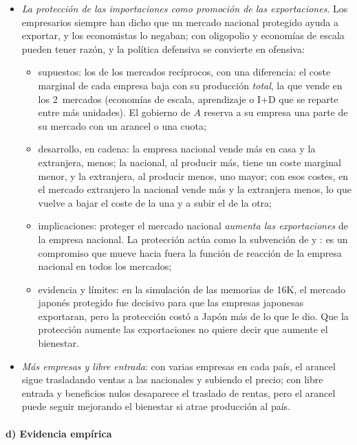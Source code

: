 \documentclass[11pt]{article}
\begin{document}
\begin{itemize}
\item \emph{La protección de las importaciones como promoción de las exportaciones}\nocite{Krugman1984Import}. Los empresarios siempre han dicho que un mercado nacional protegido ayuda a exportar, y los economistas lo negaban; con oligopolio y economías de escala pueden tener razón, y la política defensiva se convierte en ofensiva:
  \begin{itemize}
  \item supuestos: los de los mercados recíprocos, con una diferencia: el coste marginal de cada empresa baja con su producción \emph{total}, la que vende en los 2~mercados (economías de escala, aprendizaje o I+D que se reparte entre más unidades). El gobierno de $A$ reserva a su empresa una parte de su mercado con un arancel o una cuota;
  \item desarrollo, en cadena: la empresa nacional vende más en casa y la extranjera, menos; la nacional, al producir más, tiene un coste marginal menor, y la extranjera, al producir menos, uno mayor; con esos costes, en el mercado extranjero la nacional vende más y la extranjera menos, lo que vuelve a bajar el coste de la una y a subir el de la otra;
  \item implicaciones: proteger el mercado nacional \emph{aumenta las exportaciones} de la empresa nacional. La protección actúa como la subvención de  y : es un compromiso que mueve hacia fuera la función de reacción de la empresa nacional en todos los mercados;
  \item evidencia y límites: en la simulación de las memorias de 16K, el mercado japonés protegido fue decisivo para que las empresas japonesas exportaran, pero la protección costó a Japón más de lo que le dio\nocite{BaldwinKrugman1986Market}. Que la protección aumente las exportaciones no quiere decir que aumente el bienestar.
  \end{itemize}
\item \emph{Más empresas y libre entrada}: con varias empresas en cada país, el arancel sigue trasladando ventas a las nacionales y subiendo el precio; con libre entrada y beneficios nulos desaparece el traslado de rentas, pero el arancel puede seguir mejorando el bienestar si atrae producción al país\nocite{Brander1995Strategic}.
\end{itemize}

\paragraph{d) Evidencia empírica}
\end{document}
